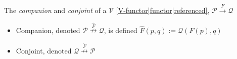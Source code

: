 
The \emph{companion} and \emph{conjoint} of a $\mathcal{V}$ \ref{V-functor|functor|referenced}, $\mathcal{P}\xrightarrow{F}\mathcal{Q}$

\begin{itemize}
    \item  Companion, denoted $\mathcal{P}\overset{\hat F}\nrightarrow \mathcal{Q}$, is defined $\hat{F}(p,q):=\mathcal{Q}(F(p),q)$
    \item Conjoint, denoted $\mathcal{Q}\overset{\check{F}}\nrightarrow\mathcal{P}$
  \end{itemize}
